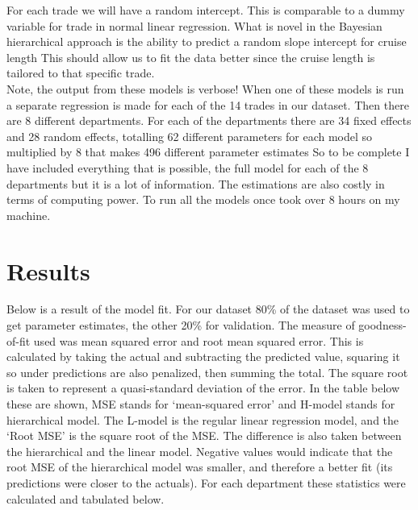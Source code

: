 \documentclass{article}
\begin{document}
	For each trade we will have a random intercept. This is comparable to a dummy variable for trade in normal linear regression. What is novel in the Bayesian hierarchical approach is the ability to predict a random slope intercept for cruise length This should allow us to fit the data better since the cruise length is tailored to that specific trade. \\
	
	Note, the output from these models is verbose! When one of these models is run a separate regression is made for each of the 14 trades in our dataset. Then there are 8 different departments. For each of the departments there are 34 fixed effects and 28 random effects, totalling 62 different parameters for each model so multiplied by 8 that makes 496 different parameter estimates So to be complete I have included everything that is possible, the full model for each of the 8 departments but it is a lot of information. The estimations are also costly in terms of computing power. To run all the models once took over 8 hours on my machine. \\
	
	\section{Results} Below is a result of the model fit. For our dataset 80\% of the dataset was used to get parameter estimates, the other 20\% for validation. The measure of goodness-of-fit used was mean squared error and root mean squared error. This is calculated by taking the actual and subtracting the predicted value, squaring it so under predictions are also penalized, then summing the total. The square root is taken to represent a quasi-standard deviation of the error. In the table below these are shown, MSE stands for `mean-squared error' and H-model stands for hierarchical model. The L-model is the regular linear regression model, and the `Root MSE' is the square root of the MSE. The difference is also taken between the hierarchical and the linear model. Negative values would indicate that the root MSE of the hierarchical model was smaller, and therefore a better fit (its predictions were closer to the actuals). For each department these statistics were calculated and tabulated below. 
	
	
			
\end{document}
